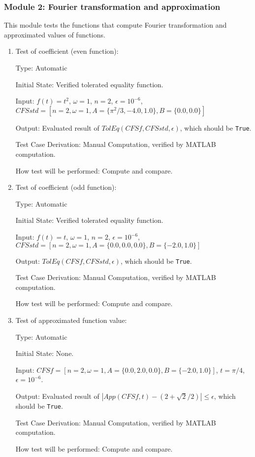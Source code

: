 \documentclass[12pt, titlepage]{article}
\newcommand{\li}[1]{\texttt{#1}}
\begin{document}
\subsubsection{Module 2: Fourier transformation and approximation}
This module tests the functions that compute Fourier transformation and approximated values of functions.

\begin{enumerate}
	\item{Test of coefficient (even function):\\}
	
	Type: Automatic
	
	Initial State: Verified tolerated equality function.
	
	Input: $f(t)=t^2$, $\omega=1$, $n=2$, $\epsilon=10^{-6}$, $\mathit{CFSstd}=[n=2,\omega=1, A=\{\pi^2/3, -4.0, 1.0\}, B=\{0.0, 0.0\}]$
	
	Output: Evaluated result of $\mathit{TolEq}(\mathit{CFSf}, \mathit{CFSstd}, \epsilon)$, which should be \li{True}.
	
	Test Case Derivation: Manual Computation, verified by MATLAB computation.
	
	How test will be performed: Compute and compare.
	
	\item{Test of coefficient (odd function):\\}
	
	Type: Automatic	
	
	Initial State: Verified tolerated equality function.
	
	Input: $f(t)=t$, $\omega=1$, $n=2$, $\epsilon=10^{-6}$, $\mathit{CFSstd}=[n=2,\omega=1, A=\{0.0, 0.0, 0.0\}, B=\{-2.0, 1.0\}]$
	
	Output: $\mathit{TolEq}(\mathit{CFSf}, \mathit{CFSstd}, \epsilon)$, which should be \li{True}.
	
	Test Case Derivation: Manual Computation, verified by MATLAB computation.
	
	How test will be performed: Compute and compare.
	
	\item{Test of approximated function value: \\}
	
	Type: Automatic
	
	Initial State: None.
	
	Input: $\mathit{CFSf}=[n=2,\omega=1, A=\{0.0, 2.0, 0.0\}, B=\{-2.0, 1.0\}]$, $t=\pi/4$, $\epsilon=10^{-6}$.
	
	Output: Evaluated result of $|\mathit{App}(\mathit{CFSf}, t)-(2+\sqrt{2}/2)|\leq\epsilon$, which should be \li{True}.
	
	Test Case Derivation: Manual Computation, verified by MATLAB computation.
	
	How test will be performed: Compute and compare.
	
\end{enumerate}
\end{document}
